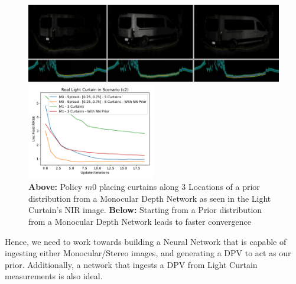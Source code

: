 \begin{figure}[h]
    \centering
    \begin{minipage}{0.5\textwidth}
        \centering
        \includegraphics[width=1.0\textwidth]{figures/placement.png}
    \end{minipage}\hfill
    \begin{minipage}{0.5\textwidth}
        \centering
        \includegraphics[width=0.5\textwidth]{figures/figure_X.pdf}
    \end{minipage}\hfill
    \centering
    \caption{\textbf{Above:} Policy $m0$ placing curtains along 3 Locations of a prior distribution from a Monocular Depth Network as seen in the Light Curtain's NIR image. \textbf{Below:} Starting from a Prior distribution from a Monocular Depth Network leads to faster convergence}
    \label{fig:prior}
\end{figure}

Hence, we need to work towards building a Neural Network that is capable of ingesting either Monocular/Stereo images, and generating a DPV to act as our prior. Additionally, a network that ingests a DPV from Light Curtain measurements is also ideal.


